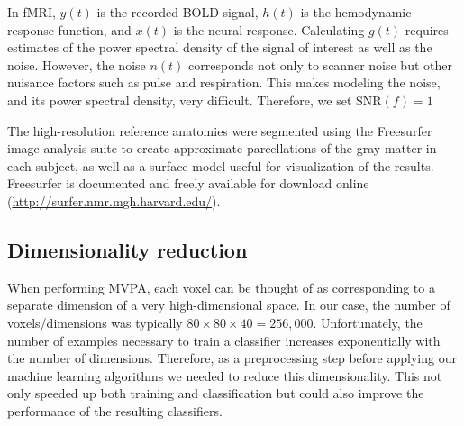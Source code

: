 \documentclass[preprint,5p,authoryear]{elsarticle}
\begin{document}
In fMRI, $y(t)$ is the recorded BOLD signal, $h(t)$ is the hemodynamic response function, and $x(t)$ is the neural response.
Calculating $g(t)$ requires estimates of the power spectral density of the signal of interest as well as the noise.
However, the noise $n(t)$ corresponds not only to scanner noise but other nuisance factors such as pulse and respiration.
This makes modeling the noise, and its power spectral density, very difficult.
Therefore, we set $\mbox{SNR}(f) = 1$%

The high-resolution reference anatomies were segmented using the Freesurfer image analysis suite to create approximate parcellations of the gray matter in each subject, as well as a surface model useful for visualization of the results.
Freesurfer is documented and freely available for download online (\url{http://surfer.nmr.mgh.harvard.edu/}).

\subsection{Dimensionality reduction}
When performing MVPA, each voxel can be thought of as corresponding to a separate dimension of a very high-dimensional space.
In our case, the number of voxels/dimensions was typically $80 \times 80 \times 40 = 256,000$.
Unfortunately, the number of examples necessary to train a classifier increases exponentially with the number of dimensions.
Therefore, as a preprocessing step before applying our machine learning algorithms we needed to reduce this dimensionality.
This not only speeded up both training and classification but could also improve the performance of the resulting classifiers.
\end{document}
